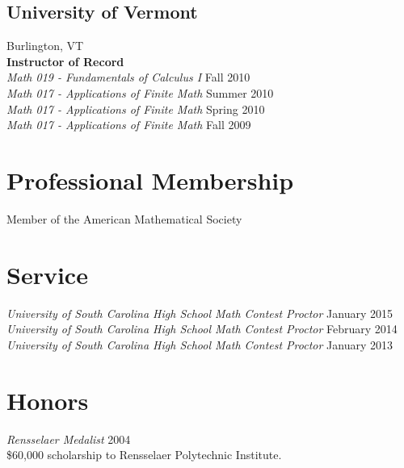 \documentclass{article}
\begin{document}
\subsection*{University of Vermont}
\noindent Burlington, VT\\

\noindent\textbf{Instructor of Record}\\
\textsl{Math 019 - Fundamentals of Calculus I} \hfill Fall 2010\\
\textsl{Math 017 - Applications of Finite Math} \hfill Summer 2010\\
\textsl{Math 017 - Applications of Finite Math} \hfill Spring 2010\\
\textsl{Math 017 - Applications of Finite Math} \hfill Fall 2009\\



\section*{Professional Membership}
Member of the American Mathematical Society

\section*{Service}
\textsl{University of South Carolina High School Math Contest Proctor} \hfill January 2015\\
\textsl{University of South Carolina High School Math Contest Proctor} \hfill February 2014\\
\textsl{University of South Carolina High School Math Contest Proctor} \hfill January 2013

\section*{Honors}
\textsl{Rensselaer Medalist} \hfill 2004\\
\$60,000 scholarship to Rensselaer Polytechnic Institute.\\
\end{document}
